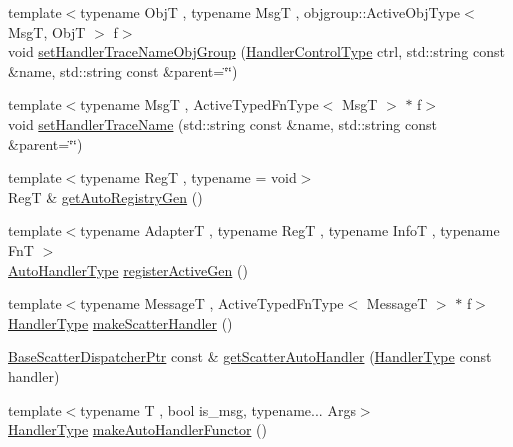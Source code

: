 \begin{DoxyCompactItemize}
\item 
{\footnotesize template$<$typename ObjT , typename MsgT , objgroup\+::\+Active\+Obj\+Type$<$ Msg\+T, Obj\+T $>$ f$>$ }\\void \hyperlink{namespacevt_1_1auto__registry_a1eb25883c6f5332dbbf4a61bd22bbf2f}{set\+Handler\+Trace\+Name\+Obj\+Group} (\hyperlink{namespacevt_adbbef13b92f0a93b14c219b7cc8a48f2}{Handler\+Control\+Type} ctrl, std\+::string const \&name, std\+::string const \&parent=\char`\"{}\char`\"{})
\item 
{\footnotesize template$<$typename MsgT , Active\+Typed\+Fn\+Type$<$ Msg\+T $>$ $\ast$ f$>$ }\\void \hyperlink{namespacevt_1_1auto__registry_a9239b3d69aac342e6b7d7554ef84a9cc}{set\+Handler\+Trace\+Name} (std\+::string const \&name, std\+::string const \&parent=\char`\"{}\char`\"{})
\item 
{\footnotesize template$<$typename RegT , typename  = void$>$ }\\RegT \& \hyperlink{namespacevt_1_1auto__registry_ab2ee3a933397aba4f50be12646be5fa7}{get\+Auto\+Registry\+Gen} ()
\item 
{\footnotesize template$<$typename AdapterT , typename RegT , typename InfoT , typename FnT $>$ }\\\hyperlink{namespacevt_1_1auto__registry_ae295e18699146815bb7d7674594d95d7}{Auto\+Handler\+Type} \hyperlink{namespacevt_1_1auto__registry_aa16ec3feb8483e91ba4775b634ba0c65}{register\+Active\+Gen} ()
\item 
{\footnotesize template$<$typename MessageT , Active\+Typed\+Fn\+Type$<$ Message\+T $>$ $\ast$ f$>$ }\\\hyperlink{namespacevt_af64846b57dfcaf104da3ef6967917573}{Handler\+Type} \hyperlink{namespacevt_1_1auto__registry_a4fa21479ba39b8c493729b941f9f267b}{make\+Scatter\+Handler} ()
\item 
\hyperlink{namespacevt_1_1auto__registry_aba7be4c573c0f1361c024e4d3293a62a}{Base\+Scatter\+Dispatcher\+Ptr} const  \& \hyperlink{namespacevt_1_1auto__registry_abbf75aeffaf0835ce13b2b34502fc2cb}{get\+Scatter\+Auto\+Handler} (\hyperlink{namespacevt_af64846b57dfcaf104da3ef6967917573}{Handler\+Type} const handler)
\item 
{\footnotesize template$<$typename T , bool is\+\_\+msg, typename... Args$>$ }\\\hyperlink{namespacevt_af64846b57dfcaf104da3ef6967917573}{Handler\+Type} \hyperlink{namespacevt_1_1auto__registry_a473fb7ec675cc28fde0d6b0c5b19ac19}{make\+Auto\+Handler\+Functor} ()
\item 

\end{DoxyCompactItemize}
